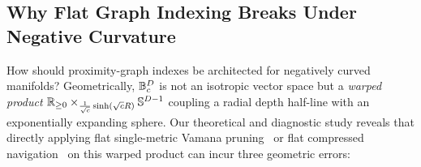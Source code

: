 \subsection{Why Flat Graph Indexing Breaks Under Negative Curvature}
\label{subsec:intro_obstructions}

How should proximity-graph indexes be architected for negatively curved manifolds?
Geometrically, $\mathbb{B}_c^D$ is not an isotropic vector space but a \emph{warped product} $\mathbb{R}_{\ge 0} \times_{\frac{1}{\sqrt{c}}\sinh(\sqrt{c}R)} \mathbb{S}^{D-1}$ coupling a radial depth half-line with an exponentially expanding sphere.
Our theoretical and diagnostic study reveals that directly applying flat single-metric {Vamana} pruning~\cite{subramanya2019diskann} or flat compressed navigation~\cite{aguerrebere2023similarity,gao2024rabitq,xiao2026quiver} on this warped product can incur three geometric errors:

